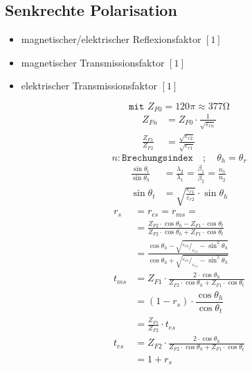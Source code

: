 \subsection{Senkrechte Polarisation}


\begin{itemize}
    \item magnetischer/elektrischer Reflexionsfaktor $[1]$
    \item magnetischer Transmissionsfaktor $[1]$
    \item elektrischer Transmissionsfaktor $[1]$
\end{itemize}

\[ \boxed{\texttt{mit } Z_{F0} = 120\pi \approx 377\si{\ohm}} \]
\begin{align*}
    Z_{Fn}                & = Z_{F0}\cdot\frac{1}{\sqrt{\varepsilon_{rn}}}            \\
    \frac{Z_{F1}}{Z_{F2}} & = \frac{\sqrt{\varepsilon_{r2}}}{\sqrt{\varepsilon_{r1}}}
\end{align*}
\[ n: \texttt{Brechungsindex} \quad ; \quad \theta_h = \theta_r\]
\begin{align*}
    \frac{\sin\theta_t}{\sin\theta_h} & = \frac{\lambda_2}{\lambda_1}= \frac{\beta_1}{\beta_2}= \frac{n_1}{n_2} \\
    \sin\theta_t                      & = \sqrt{\frac{\varepsilon_{r1}}{\varepsilon_{r2}}}\cdot \sin\theta_h
\end{align*}
\begin{align*}
    r_s     & =  r_{e s} = r_{m s} =                                                                                                                                          \\
            & = \frac{Z_{F 2} \cdot \cos \theta_h-Z_{F 1} \cdot \cos \theta_t}{Z_{F 2} \cdot \cos \theta_h+Z_{F 1} \cdot \cos \theta_t}                                       \\
            & = \frac{\cos\theta_h-\sqrt{^{\varepsilon_{r2}}/_{\varepsilon_{r1}}-\sin^2\theta_h}}{\cos\theta_h+\sqrt{^{\varepsilon_{r2}}/_{\varepsilon_{r1}}-\sin^2\theta_h}} \\
    t_{m s} & = Z_{F 1} \cdot \frac{2 \cdot \cos \theta_h}{Z_{F 2} \cdot \cos \theta_h+Z_{F 1} \cdot \cos \theta_t}                                                           \\
            & = (1 - r_{s}) \cdot \dfrac{\cos \theta_h}{\cos \theta_t}                                                                                                        \\
            & = \frac{Z_{F1}}{Z_{F2}}\cdot t_{es}                                                                                                                             \\
    t_{e s} & = Z_{F 2} \cdot \frac{2 \cdot \cos \theta_h}{Z_{F 2} \cdot \cos \theta_h+Z_{F 1} \cdot \cos \theta_t}                                                           \\
            & = 1+r_{s}
\end{align*}
